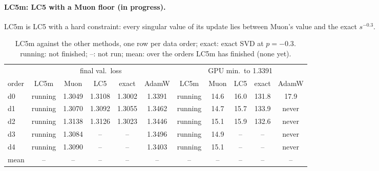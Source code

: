 \paragraph{LC5m: LC5 with a Muon floor (in progress).} LC5m is LC5 with a hard constraint: every singular value of its update lies between Muon's value and the exact $s^{-0.3}$.

\begin{table}[H]
\centering
\small
\caption{LC5m against the other methods, one row per data order; exact: exact SVD at $p=-0.3$. running: not finished; --: not run; mean: over the orders LC5m has finished (none yet).}
\label{tab:lc5m}
\setlength{\tabcolsep}{3.5pt}
\begin{tabular}{l ccccc ccccc}
\toprule
 & \multicolumn{5}{c}{final val.\ loss} & \multicolumn{5}{c}{GPU min.\ to 1.3391} \\
\cmidrule(lr){2-6}\cmidrule(lr){7-11}
order & LC5m & Muon & LC5 & exact & AdamW & LC5m & Muon & LC5 & exact & AdamW \\
\midrule
d0 & running & 1.3049 & 1.3108 & 1.3002 & 1.3391 & running & 14.6 & 16.0 & 131.8 & 17.9 \\
d1 & running & 1.3070 & 1.3092 & 1.3055 & 1.3462 & running & 14.7 & 15.7 & 133.9 & never \\
d2 & running & 1.3138 & 1.3126 & 1.3023 & 1.3446 & running & 15.1 & 15.9 & 132.6 & never \\
d3 & running & 1.3084 & -- & -- & 1.3496 & running & 14.9 & -- & -- & never \\
d4 & running & 1.3090 & -- & -- & 1.3403 & running & 15.1 & -- & -- & never \\
\midrule
mean & -- & -- & -- & -- & -- & -- & -- & -- & -- & -- \\
\bottomrule
\end{tabular}
\end{table}
